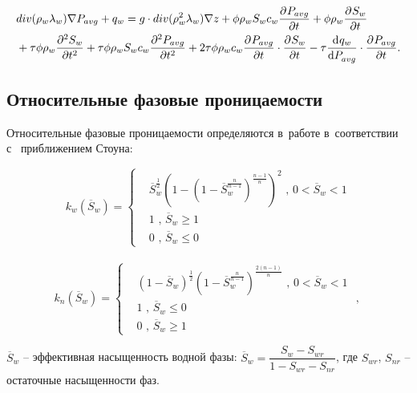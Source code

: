 \begin{equation} \label{eq:mod_saturation}
 \begin{aligned}
  & div (\rho_w\lambda_w) \nabla P_{avg} + q_w = g \cdot div (\rho_w^2\lambda_w) \nabla z + \phi \rho_w S_w c_w  \pd{P_{avg}}{t}
  + \phi \rho_w \pd{S_w}{t} \\
  & + \tau \phi \rho_w \pd[2]{S_w}{t} + \tau \phi \rho_w S_w c_w \pd[2]{P_{avg}}{t}
  + 2 \tau \phi \rho_w c_w \pd{P_{avg}}{t} \cdot \pd{S_w}{t} - \tau \dd{q_w}{P_{avg}} \cdot \pd{P_{avg}}{t}.
 \end{aligned}
\end{equation}

\subsection{Относительные фазовые проницаемости}
Относительные фазовые проницаемости определяются в~работе в~соответствии с~
приближением Стоуна\cite{Aziz-Settari}:

\begin{equation*}
  k_{w}(\overline{S}_w)=
  \begin{cases}
  &\overline{S}_w^\frac{1}{2} \left( 1-\left( 1-\overline{S}_w^\frac{n}{n-1} \right) ^\frac{n-1}{n} \right) ^2
  \text{ , $0<\overline{S}_w<1$}\\
  &1 \text{ , $\overline{S}_w\ge 1$}\\
  &0 \text{ , $\overline{S}_w\le 0$}
\end{cases} 
\end{equation*}
\\
\begin{equation*}
  k_{n}(\overline{S}_w)=
  \begin{cases}
  &(1-\overline{S}_w)^\frac{1}{2} \left(1-\overline{S}_w^\frac{n}{n-1} \right) ^\frac{2(n-1)}{n}
  \text{ , $0<\overline{S}_w<1$}\\
  &1 \text{ , $\overline{S}_w\le 0$}\\
  &0 \text{ , $\overline{S}_w\ge 1$}
  \end{cases}\text { , }
\end{equation*}

$\overline{S}_w$ -- эффективная насыщенность водной фазы:
$\overline{S}_w={\dfrac{S_w-S_{wr}}{1-S_{wr}-S_{nr}}}$, где $S_{wr}$,
$S_{nr}$ -- остаточные насыщенности фаз.
